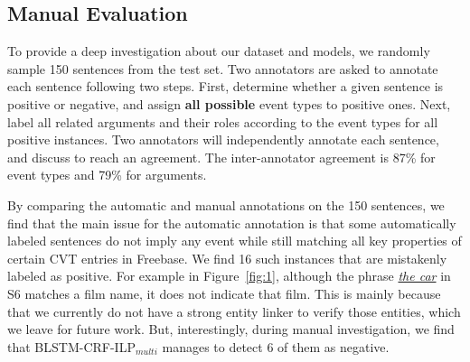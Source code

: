 \subsection{Manual Evaluation}\label{manualeve}
To provide a deep investigation about our dataset and models, we randomly sample 150 sentences
from the test set. Two annotators are asked to annotate each sentence following
two steps. First, determine whether a given sentence is positive or negative, and assign \textbf{all possible}
event types to positive ones. Next, label all related arguments and their roles according to
the event types for all positive instances. Two annotators will independently annotate each sentence,
and discuss to reach an agreement. The inter-annotator agreement is 87\% for event types and 79\% for arguments.


By comparing the automatic and manual annotations on the 150 sentences, we find that
the main issue for the automatic annotation is that some automatically labeled sentences
do not imply any event while still matching all key properties of certain CVT entries in Freebase.
We find 16 such instances that are mistakenly labeled as positive.
For example in Figure~\ref{fig:1}, although the phrase \underline{\emph{the car}} in S6 matches a film name,
it does not indicate that film. %
This is mainly because that we currently do not have a strong entity linker to verify those entities, which we leave for
future work.
But, interestingly,
during manual investigation,
we find that BLSTM-CRF-ILP$_{multi}$ manages to detect 6 of them as negative.




